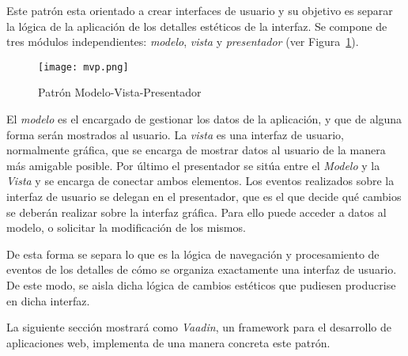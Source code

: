 
Este patrón esta orientado a crear interfaces de usuario y su objetivo es separar la lógica de la aplicación de los detalles estéticos de la interfaz. Se compone de tres módulos independientes: \emph{modelo}, \emph{vista} y \emph{presentador} (ver Figura~\ref{fig:mvp}).

\begin{figure}[!tb]
	\centering
	\texttt{[image: mvp.png]}
	\caption{Patrón Modelo-Vista-Presentador}\label{fig:mvp}
\end{figure}

El \emph{modelo} es el encargado de gestionar los datos de la aplicación, y que de alguna forma serán mostrados al usuario. La \emph{vista} es una interfaz de usuario, normalmente gráfica, que se encarga de mostrar datos al usuario de la manera más amigable posible. Por último el presentador se sitúa entre el \emph{Modelo} y la \emph{Vista} y se encarga de conectar ambos elementos. Los eventos realizados sobre la interfaz de usuario se delegan en el presentador, que es el que decide qué cambios se deberán realizar sobre la interfaz gráfica. Para ello puede acceder a datos al modelo, o solicitar la modificación de los mismos. 

De esta forma se separa lo que es la lógica de navegación y procesamiento de eventos de los detalles de cómo se organiza exactamente una interfaz de usuario. De este modo, se aisla dicha lógica de cambios estéticos que pudiesen producrise en dicha interfaz. 

La siguiente sección mostrará como \emph{Vaadin}, un framework para el desarrollo de aplicaciones web, implementa de una manera concreta este patrón.

 


